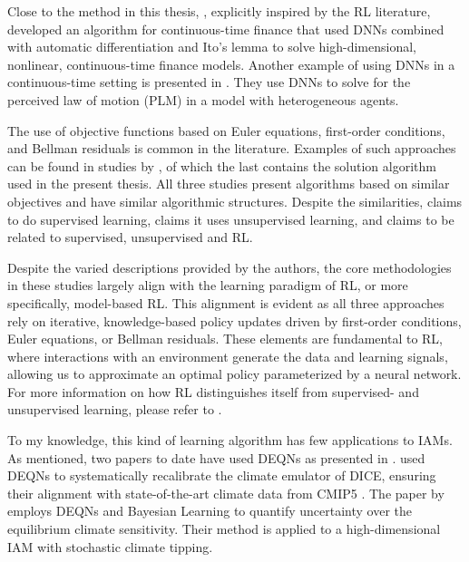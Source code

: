 Close to the method in this thesis, \textcite{Duarte2018}, explicitly inspired by the RL literature, developed an algorithm for continuous-time finance that used DNNs combined with automatic differentiation and Ito's lemma to solve high-dimensional, nonlinear, continuous-time finance models. Another example of using DNNs in a continuous-time setting is presented in \textcite{Villaverde2023fin_frictions}. They use DNNs to solve for the perceived law of motion (PLM) in a model with heterogeneous agents.

The use of objective functions based on Euler equations, first-order conditions, and Bellman residuals is common in the literature. Examples of such approaches can be found in studies by \textcite{Valaitis2024, Maliar2021, Azinovic2022DEQN}, of which the last contains the solution algorithm used in the present thesis. All three studies present algorithms based on similar objectives and have similar algorithmic structures. Despite the similarities, \textcite{Valaitis2024} claims to do supervised learning, \textcite{Azinovic2022DEQN} claims it uses unsupervised learning, and  \textcite{Maliar2021} claims to be related to supervised, unsupervised and RL. 

Despite the varied descriptions provided by the authors, the core methodologies in these studies largely align with the learning paradigm of RL, or more specifically, model-based RL. This alignment is evident as all three approaches rely on iterative, knowledge-based policy updates driven by first-order conditions, Euler equations, or Bellman residuals. These elements are fundamental to RL, where interactions with an environment generate the data and learning signals, allowing us to approximate an optimal policy parameterized by a neural network. For more information on how RL distinguishes itself from supervised- and unsupervised learning, please refer to \textcite[p.~2]{Sutton2018intro_to_rl}. %

To my knowledge, this kind of learning algorithm has few applications to IAMs. As mentioned, two papers to date have used DEQNs as presented in \textcite{Azinovic2022DEQN}. \textcite{Folini2024ClimateInCE} used DEQNs to systematically recalibrate the climate emulator of DICE, ensuring their alignment with state-of-the-art climate data from CMIP5 \parencite{Taylor2012cmip5}. The paper by \textcite{friedl2023_deepUQ} employs DEQNs and Bayesian Learning to quantify uncertainty over the equilibrium climate sensitivity. Their method is applied to a high-dimensional IAM with stochastic climate tipping.

